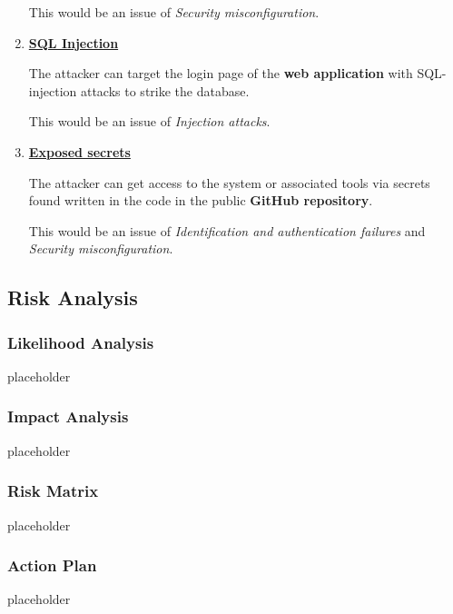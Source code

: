 \begin{enumerate}
    This would be an issue of \textit{Security misconfiguration}.
    \item \textbf{\underline{SQL Injection}}

    The attacker can target the login page of the \textbf{web application} with SQL-injection attacks to strike the database.

    This would be an issue of \textit{Injection attacks}.
    \item \textbf{\underline{Exposed secrets}}

    The attacker can get access to the system or associated tools via secrets found written in the code in the public \textbf{GitHub repository}.

    This would be an issue of \textit{Identification and authentication failures} and \textit{Security misconfiguration}.
\end{enumerate}
\subsection{Risk Analysis}
\subsubsection{Likelihood Analysis}
placeholder
\subsubsection{Impact Analysis}
placeholder
\subsubsection{Risk Matrix}
placeholder
\subsubsection{Action Plan}
placeholder
